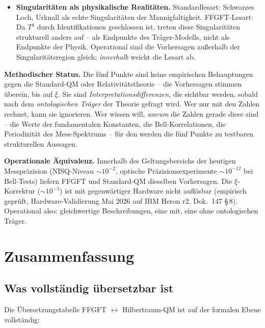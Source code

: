 \begin{itemize}[leftmargin=2em,itemsep=4pt,topsep=4pt]
  \item \textbf{Singularit\"aten als physikalische Realit\"aten.}
        Standardlesart: Schwarzes Loch, Urknall als echte
        Singularit\"aten der Mannigfaltigkeit. FFGFT-Lesart: Da $T^4$
        durch Identifikationen geschlossen ist, treten diese
        Singularit\"aten strukturell anders auf -- als
        Endpunkte des Tr\"ager-Modells, nicht als Endpunkte der
        Physik. Operational sind die Vorhersagen au\ss erhalb der
        Singularit\"atsregion gleich; \emph{innerhalb} weicht die
        Lesart ab.
\end{itemize}

\textbf{Methodischer Status.} Die f\"unf Punkte sind keine empirischen
Behauptungen gegen die Standard-QM oder Relativit\"atstheorie -- die
Vorhersagen stimmen \"uberein, bis auf $\xi$. Sie sind
\emph{Interpretationsdifferenzen}, die sichtbar werden, sobald nach
dem \emph{ontologischen Tr\"ager} der Theorie gefragt wird. Wer nur
mit den Zahlen rechnet, kann sie ignorieren. Wer wissen will,
\emph{warum} die Zahlen gerade diese sind -- die Werte der
fundamentalen Konstanten, die Bell-Korrelationen, die Periodizit\"at
des Mess-Spektrums -- f\"ur den werden die f\"unf Punkte zu
testbaren strukturellen Aussagen.

\textbf{Operationale \"Aquivalenz.} Innerhalb des Geltungsbereichs der
heutigen Messpr\"azision (NISQ-Niveau $\sim 10^{-2}$, optische
Pr\"azisionsexperimente $\sim 10^{-12}$ bei Bell-Tests) liefern FFGFT
und Standard-QM dieselben Vorhersagen. Die $\xi$-Korrektur
($\sim 10^{-5}$) ist mit gegenw\"artiger Hardware nicht aufl\"osbar
(empirisch gepr\"uft, Hardware-Validierung Mai 2026 auf IBM Heron r2,
Dok.~147 §\,8). Operational also: gleichwertige Beschreibungen, eine
mit, eine ohne ontologischen Tr\"ager.

\section{Zusammenfassung}

\subsection*{Was vollständig übersetzbar ist}

Die Übersetzungstabelle FFGFT $\leftrightarrow$ Hilbertraum-QM ist
auf der formalen Ebene vollständig:

